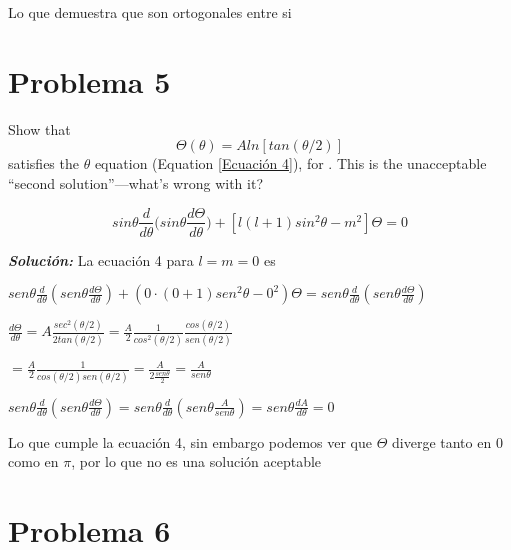 \documentclass[10pt]{article}
\begin{document}
Lo que demuestra que son ortogonales entre si
\medskip

\section{Problema 5}

\medskip
\begin{tcolorbox}[colback=gray!10, colframe=black, title=Problem 5]

Show that 
$$\Theta(\theta)=Aln[tan(\theta/2)]$$
satisfies the $\theta$ equation (Equation \ref{Ecuación 4}), for . This is the unacceptable
“second solution”—what’s wrong with it?

\begin{equation}
    sin\theta\frac{d}{d\theta}\bigg( sin\theta\frac{d\Theta}{d\theta} \bigg) + [l(l+1)sin^{2}\theta-m^{2}]\Theta=0
    \label{Ecuación 4}
\end{equation}

\end{tcolorbox}
\medskip


\Large{\textit{\textbf{Solución:}}}
La ecuación 4 para $l=m=0$ es 
\begin{center}
    $sen\theta\frac{d}{d\theta}(sen\theta\frac{d\Theta}{d\theta})+(0\cdot(0+1)sen^2\theta-0^2)\Theta=sen\theta\frac{d}{d\theta}(sen\theta\frac{d\Theta}{d\theta})$

    $\frac{d\Theta}{d\theta}=A\frac{sec^2(\theta/2)}{2tan(\theta/2)}=\frac{A}{2}\frac{1}{cos^2(\theta/2)}\frac{cos(\theta/2)}{sen(\theta/2)}$

    $=\frac{A}{2}\frac{1}{cos(\theta/2)sen(\theta/2)}=\frac{A}{2\frac{sen\theta}{2}}=\frac{A}{sen\theta}$

    $sen\theta\frac{d}{d\theta}(sen\theta\frac{d\Theta}{d\theta})=sen\theta\frac{d}{d\theta}(sen\theta\frac{A}{sen\theta})=sen\theta\frac{dA}{d\theta}=0$
\end{center}

Lo que cumple la ecuación 4, sin embargo podemos ver que $\Theta$ diverge tanto en 0 como en $\pi$, por lo que no es una solución aceptable

\medskip

\section{Problema 6}
\end{document}
